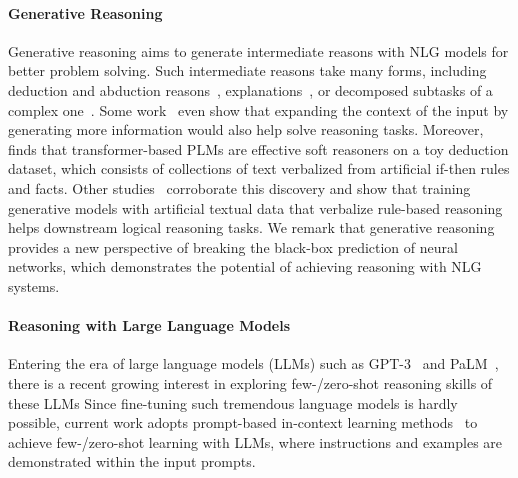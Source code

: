 \paragraph{Generative Reasoning}


Generative reasoning aims to generate intermediate reasons with NLG models for better problem solving.
Such intermediate reasons take many forms, including deduction and abduction reasons~\cite{tafjord-etal-2021-proofwriter},  explanations~\cite{jhamtani-clark-2020-learning}, or decomposed subtasks of a complex one~\cite{khot-etal-2021-text}.
Some work~\cite{shwartz-etal-2020-unsupervised,betz2021thinking} even show that expanding the context of the input by generating more information would also help solve reasoning tasks.
Moreover, \cite{ijcai2020-0537} finds that transformer-based PLMs are effective soft reasoners on a toy deduction dataset, which consists of collections of text verbalized from artificial if-then rules and facts.
Other studies~\cite{bostrom-etal-2021-flexible,betz-etal-2021-critical} corroborate this discovery and show that training generative models with artificial textual data that verbalize rule-based reasoning helps downstream logical reasoning tasks.
We remark that generative reasoning provides a new perspective of breaking the black-box prediction of neural networks, which demonstrates the potential of achieving reasoning with NLG systems.



\paragraph{Reasoning with Large Language Models}

Entering the era of large language models (LLMs) such as GPT-3~\cite{NEURIPS2020_1457c0d6,ouyang2022training} and PaLM~\cite{chowdhery2022palm}, there is a recent growing interest in exploring few-/zero-shot reasoning skills of these LLMs
Since fine-tuning such tremendous language models is hardly possible, current work adopts prompt-based in-context learning methods~\cite{NEURIPS2020_1457c0d6,lu-etal-2022-fantastically} to achieve few-/zero-shot learning with LLMs, where instructions and examples are demonstrated within the input prompts.


